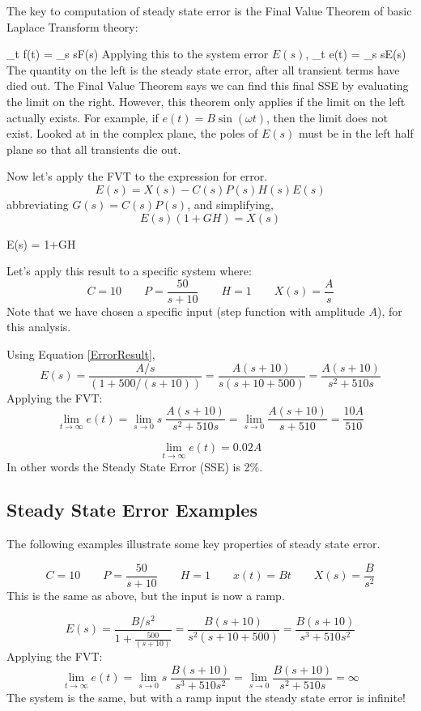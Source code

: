 The key to computation of steady state error is the Final Value Theorem of basic Laplace Transform theory:

\bq\label{FVTheorem}
\lim_{t\to\infty} f(t) = \lim_{s} sF(s)
\eq
Applying this to the system error $E(s)$,
\bq
\lim_{t\to\infty} e(t) = \lim_{s} sE(s)
\eq
The quantity on the left is the steady state error, after all transient terms have died out.   The Final Value Theorem says we can find this final SSE by evaluating the limit on the right.  However, this theorem only applies if the limit on the left actually exists.  For example, if
$e(t) = B\sin(\omega t)$, then the limit does not exist.  Looked at in the complex plane, the poles of $E(s)$ must be in the left half plane so that all transients die out.

Now let's apply the FVT to the expression for error.
\[
E(s) = X(s) - C(s)P(s)H(s)E(s)
\]
abbreviating $G(s) = C(s)P(s)$, and simplifying,
\[
E(s) \left( 1+GH \right) = X(s)
\]

\bq\label{ErrorResult}
E(s) =  {1+GH}
\eq

Let's apply this result to a specific system where:
\[
C = 10 \qquad P = \frac{50}{s+10} \qquad H = 1 \qquad X(s) = \frac{A}{s}
\]
Note that we have chosen a specific input (step function with amplitude $A$), for this analysis.

Using Equation \ref{ErrorResult},
\[
E(s) = \frac{A/s}{(1+500/(s+10))} = \frac{A(s+10)}{s(s+10+500)}= \frac{A(s+10)}{s^2+510s}
\]
Applying the FVT:
\[
\lim_{t\to\infty} e(t) = \lim_{s\to 0} s\;\frac{A(s+10)}{s^2+510s} = \lim_{s\to 0} \frac{A(s+10)}{s+510} = \frac{10A}{510}
\]

\[
\lim_{t\to\infty} e(t) =  0.02A
\]
In other words the Steady State Error (SSE) is 2\%.


\subsection{Steady State Error Examples}

The following examples illustrate some key properties of steady state error.

\begin{ExampleSmall}
\[
C = 10 \qquad P = \frac{50}{s+10} \qquad H = 1 \qquad x(t) = Bt \qquad X(s) = \frac{B}{s^2}
\]
This is the same as above, but the input is now a ramp.

\[
E(s) = \frac{B/s^2}{1+\frac{500}{(s+10)}} = \frac{B(s+10)}{s^2(s+10+500)}= \frac{B(s+10)}{s^3+510s^2}
\]
Applying the FVT:
\[
\lim_{t\to\infty} e(t) = \lim_{s\to 0} s\;\frac{B(s+10)}{s^3+510s^2} = \lim_{s\to 0} \frac{B(s+10)}{s^2+510s} = \infty
\]
The system is the same, but with a ramp input the steady state error is infinite!

\end{ExampleSmall}



